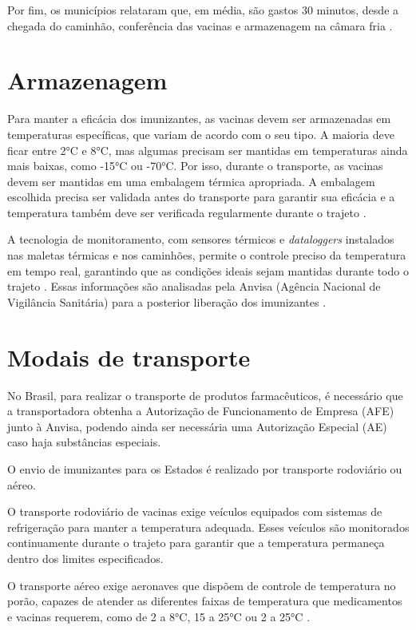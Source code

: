 Por fim, os municípios relataram que, em média, são gastos 30 minutos, desde a chegada do caminhão, conferência das vacinas e armazenagem na câmara fria \cite{LimaEtAl:2019}.

\section{Armazenagem}
Para manter a eficácia dos imunizantes, as vacinas devem ser armazenadas em temperaturas específicas, que variam de acordo com o seu tipo. A maioria deve ficar entre 2°C e 8°C, mas algumas precisam ser mantidas em temperaturas ainda mais baixas, como -15°C ou -70°C. Por isso, durante o transporte, as vacinas devem ser mantidas em uma embalagem térmica apropriada. A embalagem escolhida precisa ser validada antes do transporte para garantir sua eficácia e a temperatura também deve ser verificada regularmente durante o trajeto \cite{bosch:2024}.

A tecnologia de monitoramento, com sensores térmicos e \textit{dataloggers} instalados nas maletas térmicas e nos caminhões, permite o controle preciso da temperatura em tempo real, garantindo que as condições ideais sejam mantidas durante todo o trajeto \cite{frazzon:2024}. Essas informações são analisadas pela Anvisa (Agência Nacional de Vigilância Sanitária) para a posterior liberação dos imunizantes \cite{comprovei:2024}.

\section{Modais de transporte}
No Brasil, para realizar o transporte de produtos farmacêuticos, é necessário que a transportadora obtenha a Autorização de Funcionamento de Empresa (AFE) junto à Anvisa, podendo ainda ser necessária uma Autorização Especial (AE) caso haja substâncias especiais.

O envio de imunizantes para os Estados é realizado por transporte rodoviário ou aéreo.

O transporte rodoviário de vacinas exige veículos equipados com sistemas de refrigeração para manter a temperatura adequada. Esses veículos são monitorados continuamente durante o trajeto para garantir que a temperatura permaneça dentro dos limites especificados.

O transporte aéreo exige aeronaves que dispõem de controle de temperatura no porão, capazes de atender as diferentes faixas de temperatura que medicamentos e vacinas requerem, como de 2 a 8°C, 15 a 25°C ou 2 a 25°C \cite{aglcargo:2025}.
\bigskip
